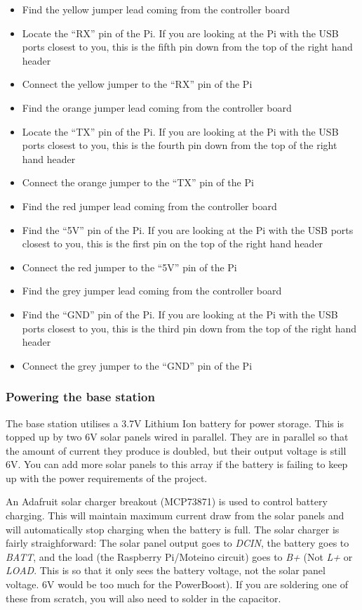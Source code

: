 \documentclass[10pt]{article}
\begin{document}
\begin{itemize}
 \item Find the yellow jumper lead coming from the controller board
 \item Locate the ``RX'' pin of the Pi. If you are looking at the Pi with the USB ports closest to you, this is the fifth pin down from the top of the right hand header
 \item Connect the yellow jumper to the ``RX'' pin of the Pi
 \item Find the orange jumper lead coming from the controller board
 \item Locate the ``TX'' pin of the Pi. If you are looking at the Pi with the USB ports closest to you, this is the fourth pin down from the top of the right hand header
 \item Connect the orange jumper to the ``TX'' pin of the Pi
 \item Find the red jumper lead coming from the controller board
 \item Find the ``5V'' pin of the Pi. If you are looking at the Pi with the USB ports closest to you, this is the first pin on the top of the right hand header
 \item Connect the red jumper to the ``5V'' pin of the Pi
 \item Find the grey jumper lead coming from the controller board
 \item Find the ``GND'' pin of the Pi. If you are looking at the Pi with the USB ports closest to you, this is the third pin down from the top of the right hand header
 \item Connect the grey jumper to the ``GND'' pin of the Pi
\end{itemize}

\subsubsection{Powering the base station}
The base station utilises a 3.7V Lithium Ion battery for power storage. This is topped up by two 6V solar panels wired in parallel. They are in parallel so that the amount of current they produce is doubled, but their output voltage is still 6V. You can add more solar panels to this array if the battery is failing to keep up with the power requirements of the project.

An Adafruit solar charger breakout (MCP73871) is used to control battery charging. This will maintain maximum current draw from the solar panels and will automatically stop charging when the battery is full. The solar charger is fairly straighforward: The solar panel output goes to \textit{DCIN}, the battery goes to \textit{BATT}, and the load (the Raspberry Pi/Moteino circuit) goes to \textit{B+} (Not \textit{L+} or \textit{LOAD}. This is so that it only sees the battery voltage, not the solar panel voltage. 6V would be too much for the PowerBoost). If you are soldering one of these from scratch, you will also need to solder in the capacitor.
\end{document}
